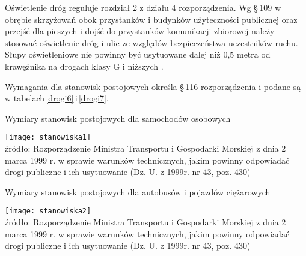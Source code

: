 \documentclass[twoside,12pt]{article}
\begin{document}
	Oświetlenie dróg reguluje rozdział 2 z działu 4 rozporządzenia. Wg §\,109 w obrębie skrzyżowań obok przystanków i budynków użyteczności publicznej oraz przejść dla pieszych i dojść do przystanków komunikacji zbiorowej należy stosować oświetlenie dróg i ulic ze względów bezpieczeństwa uczestników ruchu. Słupy oświetleniowe nie powinny być usytuowane dalej niż 0,5 metra od krawężnika na drogach klasy G i niższych \cite{rozporzadzenie_drogi}.
	
	Wymagania dla stanowisk postojowych określa §\,116 rozporządzenia i podane są w tabelach\,\ref{drogi6}\,i\,\ref{drogi7}.
	\begin{table}[H]
		\centering
		\caption{Wymiary stanowisk postojowych dla samochodów osobowych}
		\texttt{[image: stanowiska1]}\\
		\footnotesize{źródło: Rozporządzenie Ministra Transportu i Gospodarki Morskiej z dnia 2 marca 1999 r. w sprawie warunków technicznych, jakim powinny odpowiadać drogi publiczne i ich usytuowanie (Dz. U. z 1999r. nr 43, poz. 430) \cite{rozporzadzenie_drogi}}
		\label{drogi6}
	\end{table}	
	
	\begin{table}[H]
		\centering
		\caption{Wymiary stanowisk postojowych dla autobusów i pojazdów ciężarowych}
		\texttt{[image: stanowiska2]}\\
		\footnotesize{źródło: Rozporządzenie Ministra Transportu i Gospodarki Morskiej z dnia 2 marca 1999 r. w sprawie warunków technicznych, jakim powinny odpowiadać drogi publiczne i ich usytuowanie (Dz. U. z 1999r. nr 43, poz. 430) \cite{rozporzadzenie_drogi}}
		\label{drogi7}
	\end{table}	
	
\end{document}
